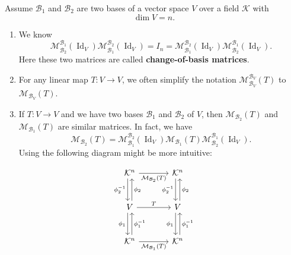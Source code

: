 	\begin{propositionenv}
		Assume $\mathcal{B}_1$ and $\mathcal{B}_2$ are two bases of a vector space $V$ over a field $\mathcal{K}$ with
		\[
		\dim V = n.
		\]
		
		\begin{enumerate}
			\item We know \[
			\mathcal{M} ^{\mathcal{B}_1}_{\mathcal{B}_2}(\operatorname{Id}_V)
			 \mathcal{M} ^{\mathcal{B}_2}_{\mathcal{B}_1}(\operatorname{Id}_V)  = I_n = \mathcal{M} ^{\mathcal{B}_2}_{\mathcal{B}_1}(\operatorname{Id}_V) 
			\mathcal{M} ^{\mathcal{B}_1}_{\mathcal{B}_2}(\operatorname{Id}_V).
			\]
			Here these two matrices are called \textbf{change-of-basis matrices}.
			\item For any linear map $T: V \to V$, we often simplify the notation $\mathcal{M} ^{\mathcal{B}_V}_{\mathcal{B}_V}(T)$ to $\mathcal{M} _{\mathcal{B}_V}(T)$.
			\item If $T:V\to V$ and we have two bases $\mathcal{B}_1$ and $\mathcal{B}_2$ of $V$, then $ \mathcal{M} _{\mathcal{B}_2}(T)$ and $\mathcal{M} _{\mathcal{B}_1}(T)$ are similar matrices. In fact, we have
			\[
			\mathcal{M} _{\mathcal{B}_2}(T) =
			\mathcal{M} ^{\mathcal{B}_2}_{\mathcal{B}_1}(\operatorname{Id}_V)
			\mathcal{M} _{\mathcal{B}_1}(T) 
			\mathcal{M} ^{\mathcal{B}_1}_{\mathcal{B}_2}(\operatorname{Id}_V).
			\]
			Using the following diagram might be more intuitive:
		\end{enumerate}
		\[
		\begin{tikzcd}[row sep=large, column sep=large]
			\mathcal{K}^n
			\arrow[r, "\mathcal{M} _{\mathcal{B}_2}(T)"']
			\arrow[d, xshift=-0.6ex, "\phi_2^{-1}" ']
			& \mathcal{K}^n
			\arrow[d, xshift=-0.6ex, "\phi_2^{-1}"'] \\
			V
			\arrow[r, "T"]
			\arrow[u, xshift=0.6ex, "\phi_2"']
			\arrow[d, xshift=-0.6ex, "\phi_1"']
			& V
			\arrow[u, xshift=0.6ex, "\phi_2"']
			\arrow[d, xshift=-0.6ex, "\phi_1"'] \\
			\mathcal{K}^n
			\arrow[r, "\mathcal{M} _{\mathcal{B}_1}(T)"']
			\arrow[u, xshift=0.6ex, "\phi_1^{-1}" ']
			& \mathcal{K}^n
			\arrow[u, xshift=0.6ex, "\phi_1^{-1}"']
		\end{tikzcd}
		\]
	\end{propositionenv}



	\newpage
